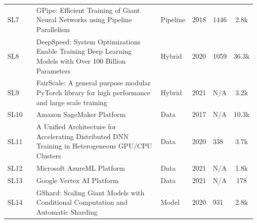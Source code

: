 \begin{table}[h!]
\begin{tabular}{llp{8.4cm}lllc}
		\small SL7         & \small \cite{huang_gpipe_2019}          & \small GPipe: Efficient Training of Giant Neural Networks using Pipeline Parallelism                             & \small Pipeline      & \small 2018          & \small 1446               & \small 2.8k \cite{noauthor_tensorflowlingvo_2025}                    \\[1ex]
		\small SL8         & \small \cite{rasley_deepspeed_2020}     & \small DeepSpeed: System Optimizations Enable Training Deep Learning Models with Over 100 Billion Parameters     & \small Hybrid        & \small 2020          & \small 1059               & \small 36.3k \cite{noauthor_microsoftdeepspeed_2025}                 \\[1ex]
		\small SL9         & \small \cite{noauthor_fairscale_nodate} & \small FairScale:  A general purpose modular PyTorch library for high performance and large scale training       & \small Hybrid        & \small 2021          & \small N/A                & \small 3.2k \cite{FairScale2021}                                     \\[1ex]
		\small SL10        & \small \cite{noauthor_amazon_nodate}    & \small Amazon SageMaker Platform                                                                                 & \small Data          & \small 2017          & \small N/A                & \small 10.3k \cite{noauthor_awsamazon-sagemaker-examples_2025}       \\[1ex]
		\small SL11        & \small \cite{jiang_unified_nodate}      & \small A Unified Architecture for Accelerating Distributed DNN Training in Heterogeneous GPU/CPU Clusters        & \small Data          & \small 2020          & \small 338                & \small 3.7k \cite{noauthor_bytedancebyteps_2025}                     \\[1ex]
		\small SL12        & \small \cite{sdgilley_azure_nodate}     & \small Microsoft AzureML Platform                                                                                & \small Data          & \small 2021          & \small N/A                & \small 1.8k \cite{noauthor_azureazureml-examples_2025}               \\[1ex]
		\small SL13        & \small \cite{noauthor_vertex_nodate}    & \small Google Vertex AI Platform                                                                                 & \small Data          & \small 2021          & \small N/A                & \small 178 \cite{noauthor_googlecloudplatformvertex-ai-samples_2025} \\[1ex]
		\small SL14        & \small \cite{lepikhin_gshard_2020}      & \small GShard: Scaling Giant Models with Conditional Computation and Automatic Sharding                          & \small Model         & \small 2020          & \small 931                & \small 2.8k \cite{noauthor_tensorflowlingvo_2025}                    \\[1ex]

\end{tabular}
\end{table}
